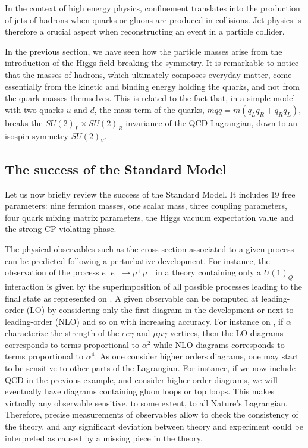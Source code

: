     In the context of high energy physics, confinement translates into the
    production of jets of hadrons when quarks or gluons are produced in
    collisions. Jet physics is therefore a crucial aspect when reconstructing an
    event in a particle collider.

    In the previous section, we have seen how the particle masses arise from the
    introduction of the Higgs field breaking the symmetry. It is remarkable to
    notice that the masses of hadrons, which ultimately composes everyday
    matter, come essentially from the kinetic and binding energy holding the
    quarks, and not from the quark masses themselves. This is related to the
    fact that, in a simple model with two quarks $u$ and $d$, the mass term of
    the quarks, $m\bar{q}q = m(\bar{q}_L q_R + \bar{q}_R q_L)$, breaks the
    $SU(2)_L \times SU(2)_R$ invariance of the QCD Lagrangian, down to an
    isospin symmetry $SU(2)_V$.

    \subsection{The success of the Standard Model \label{sec:standardModelSuccess}}

    Let us now briefly review the success of the Standard Model. It includes 19
    free parameters: nine fermion masses, one scalar mass, three coupling
    parameters, four quark mixing matrix parameters, the Higgs vacuum
    expectation value and the strong CP-violating phase.

    The physical observables such as the cross-section associated to a given
    process can be predicted following a perturbative development. For instance,
    the observation of the process $e^+ e^- \rightarrow \mu^+ \mu^-$ in a theory
    containing only a $U(1)_Q$ interaction is given by the superimposition of
    all possible processes leading to the final state as represented on
    . A given observable can be computed at
    leading-order (LO) by considering only the first diagram in the development
    or next-to-leading-order (NLO) and so on with increasing accuracy. For
    instance on , if $\alpha$ characterize
    the strength of the $ee\gamma$ and $\mu\mu\gamma$ vertices, then the LO
    diagrams corresponds to terms proportional to $\alpha^2$ while NLO diagrams
    corresponds to terms proportional to $\alpha^4$. As one consider higher
    orders diagrams, one may start to be sensitive to other parts of the
    Lagrangian. For instance, if we now include QCD in the previous example, and
    consider higher order diagrams, we will eventually have diagrams containing
    gluon loops or top loops. This makes virtually any observable sensitive, to
    some extent, to all Nature's Lagrangian. Therefore, precise measurements of
    observables allow to check the consistency of the theory, and any
    significant deviation between theory and experiment could be interpreted as
    caused by a missing piece in the theory.

